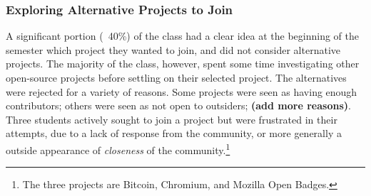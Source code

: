 \subsubsection{Exploring Alternative Projects to Join}

A significant portion (~40\%) of the class had a clear idea at the beginning of the semester which project they wanted to join, and did not consider alternative projects. The majority of the class, however, spent some time investigating other open-source projects before settling on their selected project. The alternatives were rejected for a variety of reasons. Some projects were seen as having enough contributors; others were seen as not open to outsiders; {\bf (add more reasons)}. Three students actively sought to join a project but were frustrated in their attempts, due to a lack of response from the community, or more generally a outside appearance of {\it closeness} of the community.\footnote{The three projects are Bitcoin, Chromium, and Mozilla Open Badges.}
